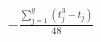 \documentclass[preview]{standalone}
\begin{document}
\begin{align*}
- \frac{\sum_{j=1}^{g} (t_j^3 - t_j)}{48}
\end{align*}
\end{document}
